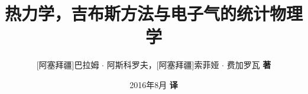 \documentclass[UTF8]{article}
\begin{document}
	\author{[阿塞拜疆]巴拉姆 $\cdot$ 阿斯科罗夫，[阿塞拜疆]索菲娅 $\cdot$ 费加罗瓦 \textbf{著}}
	\title{热力学，吉布斯方法与电子气的统计物理学}
	\date{2016年8月 \textbf{译}}
	
	\maketitle
	\newpage
	
	\tableofcontents
	
	
	

	
\end{document}
